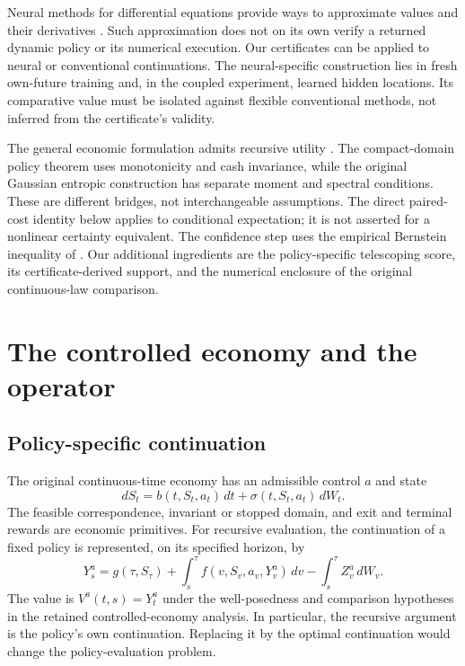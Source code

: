 \documentclass[ecta,nameyear,draft]{econsocart}
\begin{document}
Neural methods for differential equations provide ways to approximate values and their derivatives \citep{sirignano2018,han2018,hornik1990}. Such approximation does not on its own verify a returned dynamic policy or its numerical execution. Our certificates can be applied to neural or conventional continuations. The neural-specific construction lies in fresh own-future training and, in the coupled experiment, learned hidden locations. Its comparative value must be isolated against flexible conventional methods, not inferred from the certificate's validity.

The general economic formulation admits recursive utility \citep{epsteinzin1989,duffieepstein1992}. The compact-domain policy theorem uses monotonicity and cash invariance, while the original Gaussian entropic construction has separate moment and spectral conditions. These are different bridges, not interchangeable assumptions. The direct paired-cost identity below applies to conditional expectation; it is not asserted for a nonlinear certainty equivalent. The confidence step uses the empirical Bernstein inequality of \citet{maurer2009}. Our additional ingredients are the policy-specific telescoping score, its certificate-derived support, and the numerical enclosure of the original continuous-law comparison.

\section{The controlled economy and the operator}\label{sec:economy}
\subsection{Policy-specific continuation}
The original continuous-time economy has an admissible control $a$ and state
\begin{equation}\label{eq:diffusion}
 dS_t=b(t,S_t,a_t)\,dt+\sigma(t,S_t,a_t)\,dW_t.
\end{equation}
The feasible correspondence, invariant or stopped domain, and exit and terminal rewards are economic primitives. For recursive evaluation, the continuation of a fixed policy is represented, on its specified horizon, by
\[
 Y_s^a=g(\tau,S_\tau)+\int_s^\tau f(v,S_v,a_v,Y_v^a)\,dv
                 -\int_s^\tau Z_v^a\,dW_v.
\]
The value is $V^a(t,s)=Y_t^a$ under the well-posedness and comparison hypotheses in the retained controlled-economy analysis. In particular, the recursive argument is the policy's own continuation. Replacing it by the optimal continuation would change the policy-evaluation problem.
\end{document}
